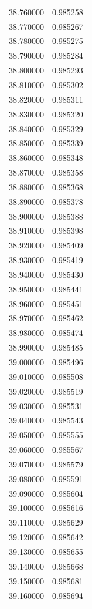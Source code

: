 \begin{tabular}{rr}
38.760000 & 0.985258 \\
38.770000 & 0.985267 \\
38.780000 & 0.985275 \\
38.790000 & 0.985284 \\
38.800000 & 0.985293 \\
38.810000 & 0.985302 \\
38.820000 & 0.985311 \\
38.830000 & 0.985320 \\
38.840000 & 0.985329 \\
38.850000 & 0.985339 \\
38.860000 & 0.985348 \\
38.870000 & 0.985358 \\
38.880000 & 0.985368 \\
38.890000 & 0.985378 \\
38.900000 & 0.985388 \\
38.910000 & 0.985398 \\
38.920000 & 0.985409 \\
38.930000 & 0.985419 \\
38.940000 & 0.985430 \\
38.950000 & 0.985441 \\
38.960000 & 0.985451 \\
38.970000 & 0.985462 \\
38.980000 & 0.985474 \\
38.990000 & 0.985485 \\
39.000000 & 0.985496 \\
39.010000 & 0.985508 \\
39.020000 & 0.985519 \\
39.030000 & 0.985531 \\
39.040000 & 0.985543 \\
39.050000 & 0.985555 \\
39.060000 & 0.985567 \\
39.070000 & 0.985579 \\
39.080000 & 0.985591 \\
39.090000 & 0.985604 \\
39.100000 & 0.985616 \\
39.110000 & 0.985629 \\
39.120000 & 0.985642 \\
39.130000 & 0.985655 \\
39.140000 & 0.985668 \\
39.150000 & 0.985681 \\
39.160000 & 0.985694 \\

\end{tabular}
